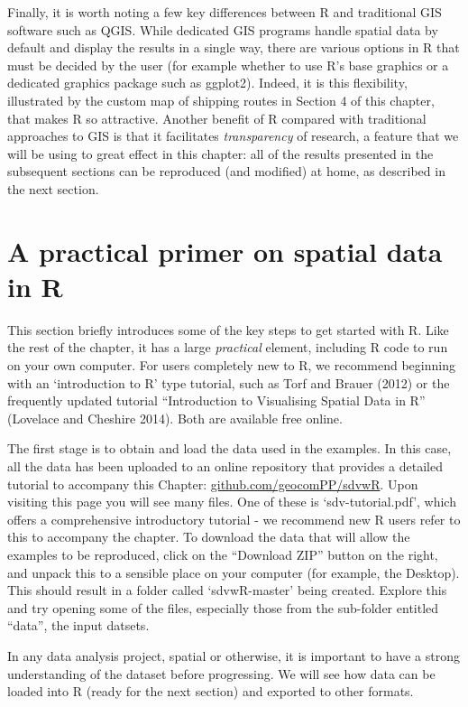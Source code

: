 \documentclass[]{article}
\begin{document}
Finally, it is worth noting a few key differences between R and
traditional GIS software such as QGIS. While dedicated GIS programs
handle spatial data by default and display the results in a single way,
there are various options in R that must be decided by the user (for
example whether to use R's base graphics or a dedicated graphics package
such as ggplot2). Indeed, it is this flexibility, illustrated by the
custom map of shipping routes in Section 4 of this chapter, that makes R
so attractive. Another benefit of R compared with traditional approaches
to GIS is that it facilitates \emph{transparency} of research, a feature
that we will be using to great effect in this chapter: all of the
results presented in the subsequent sections can be reproduced (and
modified) at home, as described in the next section.

\section{A practical primer on spatial data in R}

This section briefly introduces some of the key steps to get started
with R. Like the rest of the chapter, it has a large \emph{practical}
element, including R code to run on your own computer. For users
completely new to R, we recommend beginning with an `introduction to R'
type tutorial, such as Torf and Brauer (2012) or the frequently updated
tutorial ``Introduction to Visualising Spatial Data in R'' (Lovelace and
Cheshire 2014). Both are available free online.

The first stage is to obtain and load the data used in the examples. In
this case, all the data has been uploaded to an online repository that
provides a detailed tutorial to accompany this Chapter:
\href{https://github.com/geocomPP/sdvwR/blob/master/sdv-tutorial.pdf?raw=true}{github.com/geocomPP/sdvwR}.
Upon visiting this page you will see many files. One of these is
`sdv-tutorial.pdf', which offers a comprehensive introductory tutorial -
we recommend new R users refer to this to accompany the chapter. To
download the data that will allow the examples to be reproduced, click
on the ``Download ZIP'' button on the right, and unpack this to a
sensible place on your computer (for example, the Desktop). This should
result in a folder called `sdvwR-master' being created. Explore this and
try opening some of the files, especially those from the sub-folder
entitled ``data'', the input datsets.

In any data analysis project, spatial or otherwise, it is important to
have a strong understanding of the dataset before progressing. We will
see how data can be loaded into R (ready for the next section) and
exported to other formats.
\end{document}
